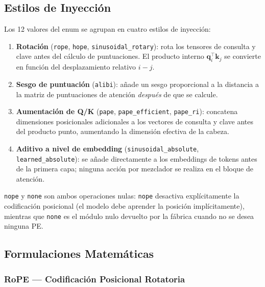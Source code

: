 \subsection{Estilos de Inyección}

Los 12 valores del enum se agrupan en cuatro estilos de inyección:

\begin{enumerate}
\item \textbf{Rotación} (\texttt{rope}, \texttt{hope},
   \texttt{sinusoidal\_rotary}): rota los tensores de consulta y clave
   antes del cálculo de puntuaciones. El producto interno
   $\mathbf{q}_i^\top\mathbf{k}_j$ se convierte en función del
   desplazamiento relativo $i-j$.
\item \textbf{Sesgo de puntuación} (\texttt{alibi}): añade un sesgo
   proporcional a la distancia a la matriz de puntuaciones de atención
   \emph{después} de que se calcule.
\item \textbf{Aumentación de Q/K} (\texttt{pape}, \texttt{pape\_efficient},
   \texttt{pape\_ri}): concatena dimensiones posicionales adicionales a
   los vectores de consulta y clave antes del producto punto, aumentando
   la dimensión efectiva de la cabeza.
\item \textbf{Aditivo a nivel de embedding} (\texttt{sinusoidal\_absolute},
   \texttt{learned\_absolute}): se añade directamente a los embeddings de
   tokens antes de la primera capa; ninguna acción por mezclador se
   realiza en el bloque de atención.
\end{enumerate}

\texttt{nope} y \texttt{none} son ambos operaciones nulas: \texttt{nope}
desactiva explícitamente la codificación posicional (el modelo debe
aprender la posición implícitamente), mientras que \texttt{none} es el
módulo nulo devuelto por la fábrica cuando no se desea ninguna PE.

\subsection{Formulaciones Matemáticas}

\subsubsection{RoPE --- Codificación Posicional Rotatoria}

